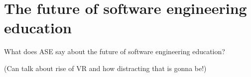\section{The future of software engineering education}

What does ASE say about the future of software engineering education?

(Can talk about rise of VR and how distracting that is gonna be!)